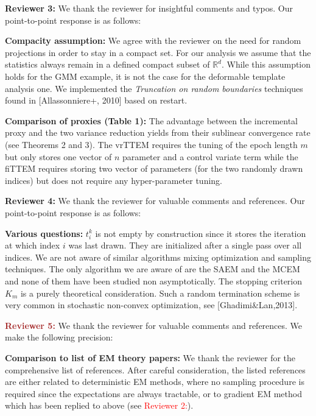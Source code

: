 \documentclass{article}
\begin{document}
\textbf{\textcolor{green!50!black}{Reviewer 3:}} We thank the reviewer for insightful comments and typos. Our point-to-point response is as follows:

\textbf{Compacity assumption:}  We agree with the reviewer on the need for random projections in order to stay in a compact set.
For our analysis we assume that the statistics always remain in a defined compact subset of $\mathbb{R}^d$.
While this assumption holds for the GMM example, it is not the case for the deformable template analysis one.
We implemented the \emph{Truncation on random boundaries} techniques found in [Allassonniere+, 2010] based on restart.

\textbf{Comparison of proxies (Table 1):} The advantage between the incremental proxy and the two variance reduction yields from their sublinear convergence rate (see Theorems 2 and 3).
The vrTTEM requires the tuning of the epoch length $m$ but only stores one vector of $n$ parameter and a control variate term while the fiTTEM requires storing two vector of parameters (for the two randomly drawn indices) but does not require any hyper-parameter tuning.

\textbf{\textcolor{yellow!50!black}{Reviewer 4:}} We thank the reviewer for valuable comments and references. Our point-to-point response is as follows:

\textbf{Various questions:} $t_i^k$ is not empty by construction since it stores the iteration at which index $i$ was last drawn. 
They are initialized after a single pass over all indices.
We are not aware of similar algorithms mixing optimization and sampling techniques. The only algorithm we are aware of are the SAEM and the MCEM and none of them have been studied non asymptotically.
The stopping criterion $K_m$ is a purely theoretical consideration. Such a random termination scheme is very common in stochastic non-convex optimization, see [Ghadimi\&Lan,2013]. 



\textbf{\textcolor{brown}{Reviewer 5:}} We thank the reviewer for valuable comments and references. We make the following precision:

\textbf{Comparison to list of EM theory papers:}
We thank the reviewer for the comprehensive list of references.
After careful consideration, the listed references are either related to deterministic EM methods, where no sampling procedure is required since the expectations are always tractable, or to gradient EM method which has been replied to above (see \textcolor{red}{Reviewer 2:}).
\end{document}
